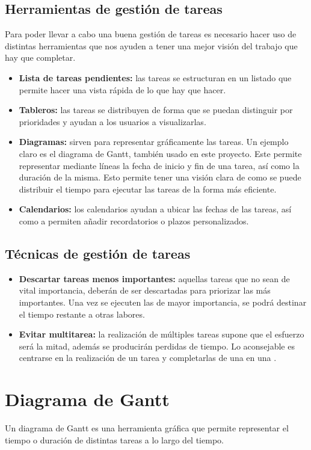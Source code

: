\subsection{Herramientas de gestión de tareas}

Para poder llevar a cabo una buena gestión de tareas es necesario hacer uso de distintas herramientas que nos ayuden a tener una mejor visión del trabajo que hay que completar.

\begin{itemize}
    \item \textbf{Lista de tareas pendientes:} las tareas se estructuran en un listado que permite hacer una vista rápida de lo que hay que hacer.
    \item \textbf{Tableros:} las tareas se distribuyen de forma que se puedan distinguir por prioridades y ayudan a los usuarios a visualizarlas.
    \item \textbf{Diagramas:} sirven para representar gráficamente las tareas. Un ejemplo claro es el diagrama de Gantt, también usado en este proyecto. Este permite representar mediante líneas la fecha de inicio y fin de una tarea, así como la duración de la misma. Esto permite tener una visión clara de como se puede distribuir el tiempo para ejecutar las tareas de la forma más eficiente.
    \item \textbf{Calendarios:} los calendarios ayudan a ubicar las fechas de las tareas, así como a permiten añadir recordatorios o plazos personalizados.
\end{itemize}

\subsection{Técnicas de gestión de tareas}
\begin{itemize}
    \item \textbf{Descartar tareas menos importantes:} aquellas tareas que no sean de vital importancia, deberán de ser descartadas para priorizar las más importantes. Una vez se ejecuten las de mayor importancia, se podrá destinar el tiempo restante a otras labores.
    \item \textbf{Evitar multitarea:} la realización de múltiples tareas supone que el esfuerzo será la mitad, además se producirán perdidas de tiempo. Lo aconsejable es centrarse en la realización de un tarea y completarlas de una en una \cite{gestion_tareas}.
\end{itemize}

\section{Diagrama de Gantt}
Un diagrama de Gantt es una herramienta gráfica que permite representar el tiempo o duración de distintas tareas a lo largo del tiempo.

